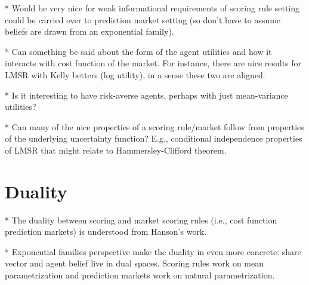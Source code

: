 \documentclass[11pt,letterpaper]{article}
\begin{document}
* Would be very nice for weak informational requirements of scoring rule setting could be carried over to prediction market setting (so don't have to assume beliefs are drawn from an exponential family).

* Can something be said about the form of the agent utilities and how it interacts with cost function of the market. For instance, there are nice results for LMSR with Kelly betters (log utility), in a sense these two are aligned.

* Is it interesting to have risk-averse agents, perhaps with just mean-variance utilities?

* Can many of the nice properties of a scoring rule/market follow from properties of the underlying uncertainty function? E.g., conditional independence properties of LMSR that might relate to Hammersley-Clifford theorem.



\section{Duality}

* The duality between scoring and market scoring rules (i.e., cost function prediction markets) is understood from Hanson's work.

* Exponential families perspective make the duality in even more concrete: share vector and agent belief live in dual spaces. Scoring rules work on mean parametrization and prediction markets work on natural parametrization.



\appendix






\end{document}
